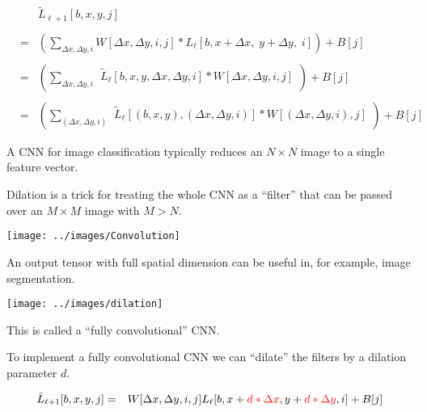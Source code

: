 {\begin{eqnarray*}
  & & \tilde{L}_{{\ell+1}}[b,x,y,j] \\
  \\
  & = & \left(\sum_{\Delta x, \Delta y, i} W[\Delta x, \Delta y, i, j] *L_{{\ell}}[b,x + \Delta x,\; y + \Delta y,\; i]\right) + B[j] \\
  \\
      & = & \left(\sum_{\Delta x, \Delta y, i} \begin{array}{l}
                                              \tilde{L}_{{\ell}}[b,x,y,\Delta x,\Delta y,i]
                                              * W[\Delta x, \Delta y, i, j] \\
  \end{array}\right) + B[j] \\
  \\
    & = & \left(\sum_{(\Delta x, \Delta y, i)} \begin{array}{l}
                                              \tilde{L}_{{\ell}}[(b,x,y),(\Delta x,\Delta y,i)]
                                              * W[(\Delta x, \Delta y, i), j] \\
                                           \end{array}\right) + B[j]
\end{eqnarray*}


A CNN for image classification typically reduces an $N \times N$ image to a single feature vector.

\vfill
Dilation is a trick for treating the whole CNN as a ``filter'' that can be passed over an $M \times M$ image with $M > N$.

\vfill
\centerline{\texttt{[image: ../images/Convolution]}}

\vfill
An output tensor with full spatial dimension can be useful in, for example, image segmentation.


\centerline{\texttt{[image: ../images/dilation]}}

\vfill
This is called a ``fully convolutional'' CNN.


To implement a fully convolutional CNN we can ``dilate'' the filters by a dilation parameter $d$.

\vfill
\begin{eqnarray*}
\tilde{L}_{{\ell+1}}[b,x,y,j] & = &  W[\Delta x, \Delta y, i, j] L_{{\ell}}[b,x + {\color{red} d*\Delta x}, y + {\color{red} d*\Delta y}, i] + B[j]
\end{eqnarray*}

}
